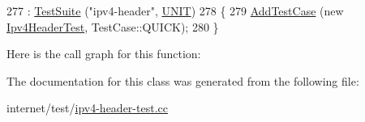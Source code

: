 \begin{DoxyCode}
277                          : \hyperlink{classns3_1_1TestSuite_a904b0c40583b744d30908aeb94636d1a}{TestSuite} (\textcolor{stringliteral}{"ipv4-header"}, \hyperlink{classns3_1_1TestSuite_a1ebfcab34ec8161e085e8e3a1855eae0a3885375a3787abf60431f8454b3cadbd}{UNIT})
278   \{
279     \hyperlink{classns3_1_1TestCase_a3718088e3eefd5d6454569d2e0ddd835}{AddTestCase} (\textcolor{keyword}{new} \hyperlink{classIpv4HeaderTest}{Ipv4HeaderTest}, TestCase::QUICK);
280   \}
\end{DoxyCode}


Here is the call graph for this function\+:




The documentation for this class was generated from the following file\+:\begin{DoxyCompactItemize}
\item 
internet/test/\hyperlink{ipv4-header-test_8cc}{ipv4-\/header-\/test.\+cc}\end{DoxyCompactItemize}

